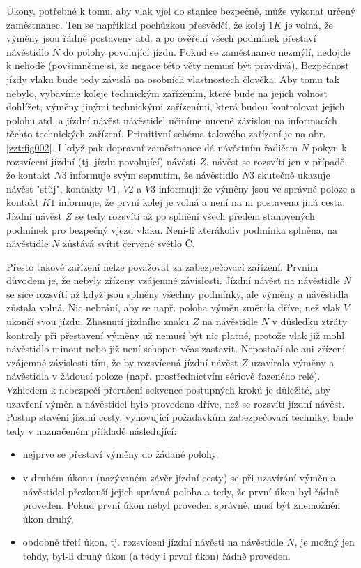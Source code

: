   Úkony, potřebné k tomu, aby vlak vjel do stanice bezpečně, může vykonat určený zaměstnanec. Ten
  se například pochůzkou přesvědčí, že kolej \(1K\) je volná, že výměny jsou řádně postaveny atd. a 
  po ověření všech podmínek přestaví návěstidlo \(N\) do polohy povolující jízdu. Pokud se 
  zaměstnanec nezmýlí, nedojde k nehodě (povšimněme si, že negace této věty nemusí být pravdivá). 
  Bezpečnost jízdy vlaku bude tedy závislá na osobních vlastnostech člověka. Aby tomu tak nebylo, 
  vybavíme koleje technickým zařízením, které bude na jejich volnost dohlížet, výměny jinými
  technickými zařízeními, která budou kontrolovat jejich polohu atd. a jízdní návěst návěstidel
  učiníme nuceně závislou na informacích těchto technických zařízení. Primitivní schéma
  takového zařízení je na obr. \ref{zzt:fig002}. I když pak dopravní zaměstnanec dá návěstním 
  řadičem \(N\) pokyn k rozsvícení jízdní (tj. jízdu povolující) návěsti \(Z\), návěst se rozsvítí 
  jen v případě, že kontakt \(N3\) informuje svým sepnutím, že návěstidlo \(N3\) skutečně ukazuje 
  návěst "stůj", kontakty \(V1\), \(V2\) a \(V3\) informují, že výměny jsou ve správné poloze a 
  kontakt \(K1\) informuje, že první kolej je volná a není na ni postavena jiná cesta. Jízdní 
  návěst \(Z\) se tedy rozsvítí až po splnění všech předem stanovených podmínek pro bezpečný vjezd 
  vlaku. Není-li kterákoliv podmínka splněna, na návěstidle \(N\) zůstává svítit červené světlo Č. 
  
  Přesto takové zařízení nelze považovat za zabezpečovací zařízení. Prvním důvodem je, že nebyly
  zřízeny vzájemné závislosti. Jízdní návěst na návěstidle \(N\) se sice rozsvítí až když jsou 
  splněny všechny podmínky, ale výměny a návěstidla zůstala volná. Nic nebrání, aby se např. poloha 
  výměn změnila dříve, než vlak \(V\) ukončí svou jízdu. Zhasnutí jízdního znaku \(Z\) na 
  návěstidle \(N\) v důsledku ztráty kontroly při přestavení výměny už nemusí být nic platné, 
  protože vlak již mohl návěstidlo minout nebo již není schopen včas zastavit. Nepostačí ale ani 
  zřízení vzájemné závislosti tím, že by rozsvícená jízdní návěst \(Z\) uzavírala výměny a 
  návěstidla v žádoucí poloze (např. prostřednictvím sériově řazeného relé). Vzhledem k nebezpečí
  přerušení sekvence postupných kroků je důležité, aby uzavření výměn a návěstidel bylo provedeno 
  dříve, než se rozsvítí jízdní návěst. Postup stavění jízdní cesty, vyhovující požadavkům 
  zabezpečovací techniky, bude tedy v naznačeném příkladě následující:
  \begin{itemize}
    \item nejprve se přestaví výměny do žádané polohy,
    \item v druhém úkonu (nazývaném závěr jízdní cesty) se při uzavírání výměn a návěstidel 
          přezkouší jejich správná poloha a tedy, že první úkon byl řádně proveden. Pokud první 
          úkon nebyl proveden správně, musí být znemožněn úkon druhý,
    \item obdobně třetí úkon, tj. rozsvícení jízdní návěsti na návěstidle \(N\), je možný jen 
          tehdy, byl-li druhý úkon (a tedy i první úkon) řádně proveden. 
  \end{itemize}
  
